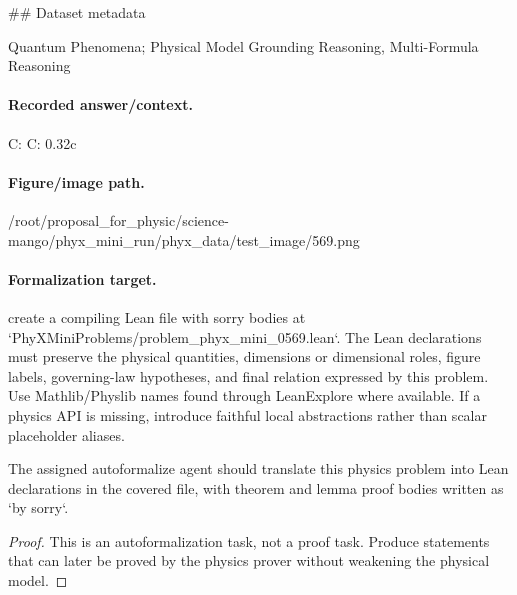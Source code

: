\#\# Dataset metadata

Quantum Phenomena; Physical Model Grounding Reasoning, Multi-Formula Reasoning

\paragraph{Recorded answer/context.}
C: C: 0.32c

\paragraph{Figure/image path.}
/root/proposal\_for\_physic/science-mango/phyx\_mini\_run/phyx\_data/test\_image/569.png

\paragraph{Formalization target.}
create a compiling Lean file with sorry bodies at `PhyXMiniProblems/problem\_phyx\_mini\_0569.lean`. The Lean declarations must preserve the physical quantities, dimensions or dimensional roles, figure labels, governing-law hypotheses, and final relation expressed by this problem.
Use Mathlib/Physlib names found through LeanExplore where available. If a physics API is missing, introduce faithful local abstractions rather than scalar placeholder aliases.

\begin{theorem}
\label{thm:physics:phyx_mini_0569:target}
The assigned autoformalize agent should translate this physics problem into Lean declarations in the covered file, with theorem and lemma proof bodies written as `by sorry`.
\end{theorem}
\begin{proof}
This is an autoformalization task, not a proof task. Produce statements that can later be proved by the physics prover without weakening the physical model.
\end{proof}


